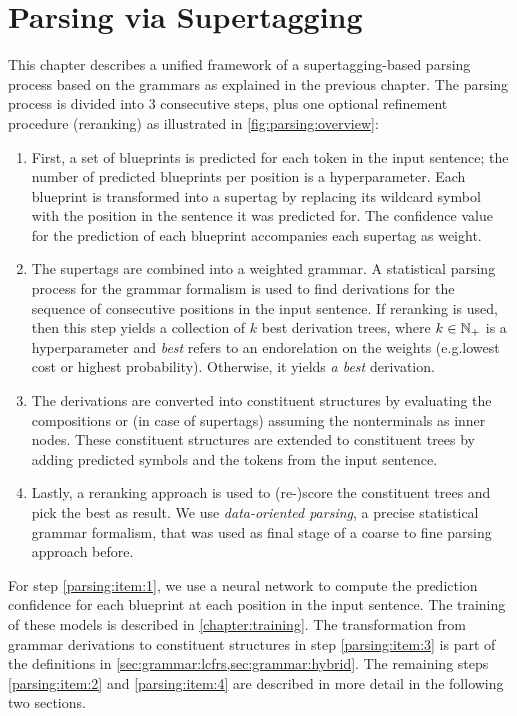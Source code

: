 \documentclass[../document.tex]{subfiles}
\begin{document}
    \chapter{Parsing via Supertagging}
    This chapter describes a unified framework of a supertagging-based parsing process based on the grammars as explained in the previous chapter.
    The parsing process is divided into 3 consecutive steps, plus one optional refinement procedure (reranking) as illustrated in \cref{fig:parsing:overview}:
    \begin{enumerate}
        \item\label{parsing:item:1}
            First, a set of blueprints is predicted for each token in the input sentence; the number of predicted blueprints per position is a hyperparameter.
            Each blueprint is transformed into a supertag by replacing its wildcard symbol with the position in the sentence it was predicted for.
            The confidence value for the prediction of each blueprint accompanies each supertag as weight.
        \item\label{parsing:item:2}
            The supertags are combined into a weighted grammar.
            A statistical parsing process for the grammar formalism is used to find derivations for the sequence of consecutive positions in the input sentence.
            If reranking is used, then this step yields a collection of \(k\) best derivation trees, where \(k \in \mathbb{N}_+\) is a hyperparameter and \emph{best} refers to an endorelation on the weights (e.g.\@ lowest cost or highest probability).
            Otherwise, it yields \emph{a best} derivation.
        \item\label{parsing:item:3}
            The derivations are converted into constituent structures by evaluating the  compositions or (in case of  supertags) assuming the nonterminals as inner nodes.
            These constituent structures are extended to constituent trees by adding predicted  symbols and the tokens from the input sentence.
        \item\label{parsing:item:4}
            Lastly, a reranking approach is used to (re-)score the constituent trees and pick the best as result.
            We use \emph{data-oriented parsing}, a precise statistical grammar formalism, that was used as final stage of a coarse to fine parsing approach before. \citep{CraSchBod16}
    \end{enumerate}
    For step \ref{parsing:item:1}, we use a neural network to compute the prediction confidence for each blueprint at each position in the input sentence.
    The training of these models is described in \cref{chapter:training}.
    The transformation from grammar derivations to constituent structures in step \ref{parsing:item:3} is part of the definitions in \cref{sec:grammar:lcfrs,sec:grammar:hybrid}.
    The remaining steps \ref{parsing:item:2} and \ref{parsing:item:4} are described in more detail in the following two sections.
\end{document}
